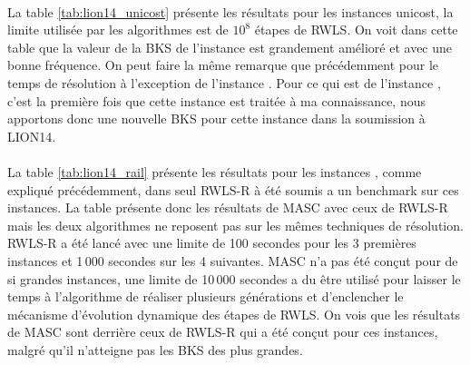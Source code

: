 \documentclass[a4paper,11pt,twoside,french,report]{../common/simplem}
\begin{document}
				\paragraph*{}
					La table \ref{tab:lion14_unicost} présente les résultats pour les instances unicost, la limite utilisée par les algorithmes est de \(10^8\) étapes de \gls{RWLS}. On voit dans cette table que la valeur de la \gls{BKS} de l'instance  est grandement amélioré et avec une bonne fréquence. On peut faire la même remarque que précédemment pour le temps de résolution à l'exception de l'instance . Pour ce qui est de l'instance , c'est la première fois que cette instance est traitée à ma connaissance, nous apportons donc une nouvelle \gls{BKS} pour cette instance dans la soumission à \acrshort{LION14}.
				\paragraph*{}
					
				\paragraph*{}
					
				\paragraph*{}
					
				\paragraph*{}
					La table \ref{tab:lion14_rail} présente les résultats pour les instances , comme expliqué précédemment, dans \cite{Gao2015} seul \gls{RWLS}-R à été soumis a un benchmark sur ces instances. La table présente donc les résultats de \gls{MASC} avec ceux de \gls{RWLS}-R mais les deux algorithmes ne reposent pas sur les mêmes techniques de résolution. \gls{RWLS}-R a été lancé avec une limite de 100 secondes pour les 3 premières instances et 1\,000 secondes sur les 4 suivantes. \gls{MASC} n'a pas été conçut pour de si grandes instances, une limite de 10\,000 secondes a du être utilisé pour laisser le temps à l'algorithme de réaliser plusieurs générations et d'enclencher le mécanisme d'évolution dynamique des étapes de \gls{RWLS}. On vois que les résultats de \gls{MASC} sont derrière ceux de \gls{RWLS}-R qui a été conçut pour ces instances, malgré qu'il n'atteigne pas les \gls{BKS} des plus grandes.
	\printbibliography[heading=bibintoc]{}
	\printglossary[type=\acronymtype,nogroupskip=true,title=Lexique,toctitle=Lexique]{}
\end{document}
